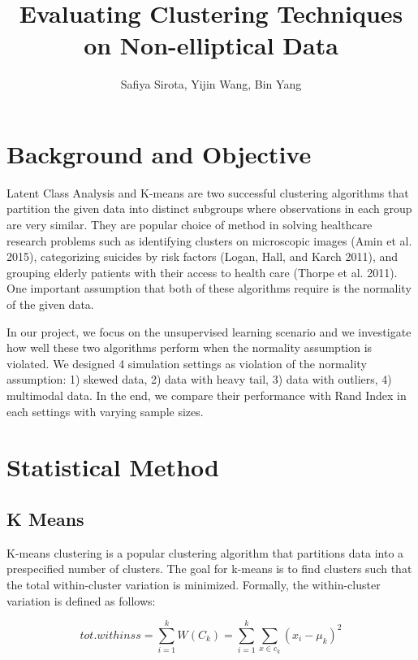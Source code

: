 \documentclass[
]{article}
\title{Evaluating Clustering Techniques on Non-elliptical Data}
\author{Safiya Sirota, Yijin Wang, Bin Yang}
\date{}
\begin{document}
\maketitle

{
\setcounter{tocdepth}{2}
\tableofcontents
}
\hypertarget{background-and-objective}{%
\section{Background and Objective}\label{background-and-objective}}

Latent Class Analysis and K-means are two successful clustering
algorithms that partition the given data into distinct subgroups where
observations in each group are very similar. They are popular choice of
method in solving healthcare research problems such as identifying
clusters on microscopic images (Amin et al. 2015), categorizing suicides
by risk factors (Logan, Hall, and Karch 2011), and grouping elderly
patients with their access to health care (Thorpe et al. 2011). One
important assumption that both of these algorithms require is the
normality of the given data.

In our project, we focus on the unsupervised learning scenario and we
investigate how well these two algorithms perform when the normality
assumption is violated. We designed 4 simulation settings as violation
of the normality assumption: 1) skewed data, 2) data with heavy tail, 3)
data with outliers, 4) multimodal data. In the end, we compare their
performance with Rand Index in each settings with varying sample sizes.

\hypertarget{statistical-method}{%
\section{Statistical Method}\label{statistical-method}}

\hypertarget{k-means}{%
\subsection{K Means}\label{k-means}}

K-means clustering is a popular clustering algorithm that partitions
data into a prespecified number of clusters. The goal for k-means is to
find clusters such that the total within-cluster variation is minimized.
Formally, the within-cluster variation is defined as follows:

\[tot.withinss = \sum_{i=1}^kW(C_k) = \sum_{i=1}^k\sum_{x\in c_k}(x_i-\mu_k)^2\]
\end{document}
